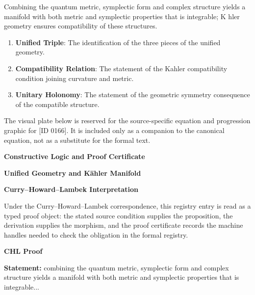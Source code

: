Combining the quantum metric, symplectic form and complex structure yields a manifold with both metric and symplectic properties that is integrable; K hler geometry ensures compatibility of these structures.  
\endgroup

\begin{enumerate}[leftmargin=1.6em,itemsep=6pt,topsep=4pt]
\item \textbf{Unified Triple}: The identification of the three pieces of the unified geometry.
\item \textbf{Compatibility Relation}: The statement of the Kahler compatibility condition joining curvature and metric.
\item \textbf{Unitary Holonomy}: The statement of the geometric symmetry consequence of the compatible structure.
\end{enumerate}

\begingroup\footnotesize\sloppy
The visual plate below is reserved for the source-specific equation and progression graphic for [ID 0166]. It is included only as a companion to the canonical equation, not as a substitute for the formal text.
\par\endgroup
\ifTZPDarkEdition
{}
\fi

\clearpage
\begingroup\tzpsupportsetup
\noindent\textbf{\fontsize{10.8pt}{12.8pt}\selectfont [ID 0166] Constructive Logic and Proof Certificate}\par
\noindent\textbf{\fontsize{10pt}{12pt}\selectfont Unified Geometry and K\"ahler Manifold}\par
\vspace{0.45em}
\begingroup
\footnotesize
\setlength{\parskip}{0.22em}
\setlength{\parindent}{0pt}
\noindent\textbf{Curry--Howard--Lambek Interpretation}\par
Under the Curry--Howard--Lambek correspondence, this registry entry is read as a typed proof
object: the stated source condition supplies the proposition, the derivation supplies the
morphism, and the proof certificate records the machine handles needed to check the obligation
in the formal registry.

\vspace{0.45em}
\noindent\textbf{CHL Proof}\par
\textbf{Statement:} combining the quantum metric, symplectic form and complex structure yields a manifold
with both metric and symplectic properties that is integrable...


